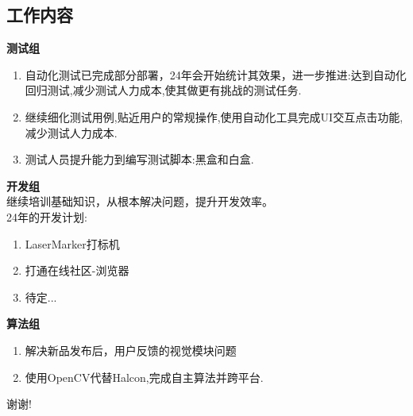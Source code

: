 \documentclass[AutoFakeBold,AutoFakeSlant]{beamer}
\begin{document}
	\subsection{工作内容}
	\begin{frame}[fragile]
	\large
	
	\begin{minipage}[l]{\linewidth}
		\footnotesize 
		\textbf{\large 测试组}
		\begin{enumerate}
			\item 自动化测试已完成部分部署，24年会开始统计其效果，进一步推进:达到自动化回归测试,减少测试人力成本,使其做更有挑战的测试任务.
			\item 继续细化测试用例,贴近用户的常规操作,使用自动化工具完成UI交互点击功能,减少测试人力成本.
			\item 测试人员提升能力到编写测试脚本:黑盒和白盒.
		\end{enumerate}
	\end{minipage}
	
	\bigskip
	\bigskip
	
	\begin{minipage}[l]{0.45\linewidth}
		\footnotesize 
		\textbf{\large 开发组}\\
		继续培训基础知识，从根本解决问题，提升开发效率。\\
		24年的开发计划:
		\begin{enumerate}
			\item LaserMarker打标机
			\item 打通在线社区-浏览器
			\item 待定...
		\end{enumerate}
	\end{minipage}\hfill
	\begin{minipage}[l]{0.45\linewidth}
		\footnotesize 
		\textbf{\large 算法组}
		\begin{enumerate}
			\item 解决新品发布后，用户反馈的视觉模块问题
			\item 使用OpenCV代替Halcon,完成自主算法并跨平台.
		\end{enumerate}
	\end{minipage}
	\end{frame}
		
	\begin{frame}[fragile]
		\begin{center}
			\Huge
			谢谢!
		\end{center}
	\end{frame}
\end{document}
